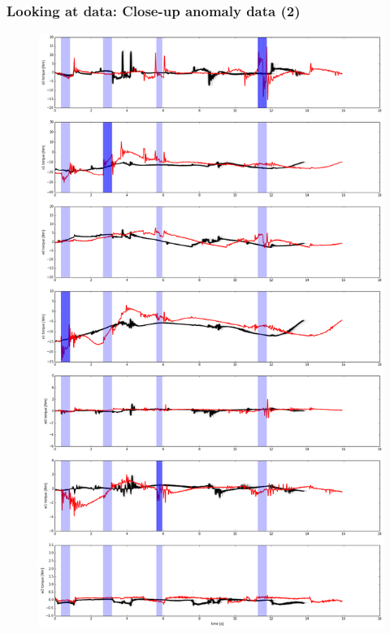 \documentclass[%
USenglish,%
pdftex,%
compress,%
10pt,%
svgnames%
,handout
]
{beamer}
\begin{document}
\begin{frame}
    \frametitle{Looking at data: Close-up anomaly data (2)}
    \begin{figure}
        \centering
        \includegraphics[width=\datawidth]{figs/anomaly50.png}
    \end{figure}
\end{frame}
\end{document}
